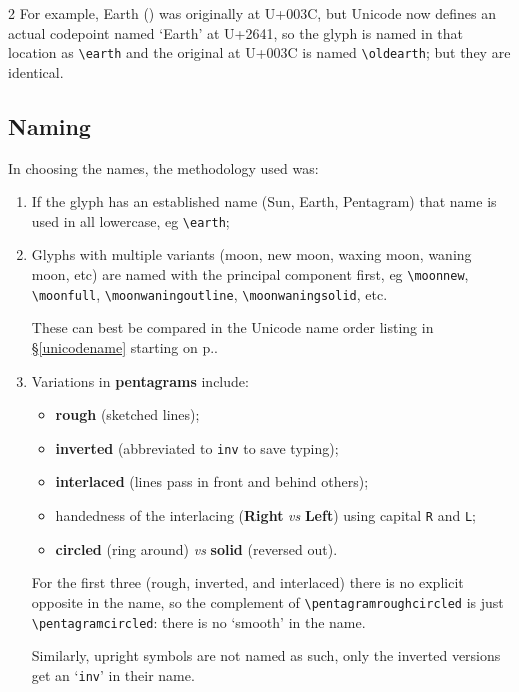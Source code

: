 \documentclass{article}
\begin{document}
\begin{multicols*}{2}
For example, Earth (\oldearth) was originally at U+003C, but
Unicode now defines an actual codepoint named `Earth' at U+2641, so
the glyph is named in that location as \verb+\earth+ and the
original at U+003C is named \verb+\oldearth+; but they are identical.

\subsection{Naming}

In choosing the names, the methodology used was:

\begin{enumerate}

\item If the glyph has an established name (Sun, Earth, Pentagram)
  that name is used in all lowercase, eg \verb+\earth+;

\item Glyphs with multiple variants (moon, new moon, waxing moon,
  waning moon, etc) are named with the principal component first, eg
  \verb+\moonnew+, \verb+\moonfull+, \verb+\moonwaningoutline+,
  \verb+\moonwaningsolid+, etc.

  These can best be compared in the Unicode name order listing in
  \hyperref[unicodename]{\S\ref{unicodename}} starting on
  p.\pageref{unicodename}.

\item Variations in \textbf{pentagrams} include:
  \begin{itemize}[nosep]
  \item \textbf{rough} (sketched lines);
  \item \textbf{inverted} (abbreviated to \texttt{inv} to save typing);
  \item \textbf{interlaced} (lines pass in front and behind others);
  \item handedness of the interlacing (\textbf{Right} \textit{vs}
    \textbf{Left}) using capital \texttt{R} and \texttt{L};
  \item \textbf{circled} (ring around) \textit{vs} \textbf{solid}
    (reversed out).
  \end{itemize}
  For the first three (rough, inverted, and interlaced) there is no
  explicit opposite in the name, so the complement of
  \verb+\pentagramroughcircled+ is just \verb+\pentagramcircled+:
  there is no `smooth' in the name.

  Similarly, upright symbols are not
  named as such, only the inverted versions get an `\texttt{inv}' in
  their name.


\end{enumerate}
\end{multicols*}
\end{document}
